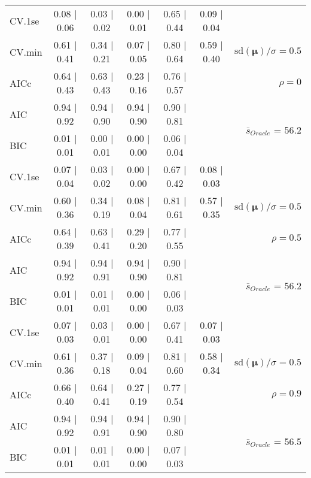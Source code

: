 \begin{table}
\begin{center}
\begin{tabular}{l*{5}{c}|r}
 \hline 
CV.1se & 0.08 $\mid$ 0.06 & 0.03 $\mid$ 0.02 & 0.00 $\mid$ 0.01 & 0.65 $\mid$ 0.44 & 0.09 $\mid$ 0.04 & \\
CV.min & 0.61 $\mid$ 0.41 & 0.34 $\mid$ 0.21 & 0.07 $\mid$ 0.05 & 0.80 $\mid$ 0.64 & 0.59 $\mid$ 0.40 &  $\mathrm{sd}(\mathbf{\mu})/\sigma=0.5$ \\
AICc & 0.64 $\mid$ 0.43 & 0.63 $\mid$ 0.43 & 0.23 $\mid$ 0.16 & 0.76 $\mid$ 0.57 & & $\rho=0$ \\
AIC & 0.94 $\mid$ 0.92 & 0.94 $\mid$ 0.90 & 0.94 $\mid$ 0.90 & 0.90 $\mid$ 0.81 & &  \multirow{2}{*}{$\bar{s}_{Oracle}$ = 56.2} \\
BIC & 0.01 $\mid$ 0.01 & 0.00 $\mid$ 0.01 & 0.00 $\mid$ 0.00 & 0.06 $\mid$ 0.04 & &  \\
 \hline 
CV.1se & 0.07 $\mid$ 0.04 & 0.03 $\mid$ 0.02 & 0.00 $\mid$ 0.00 & 0.67 $\mid$ 0.42 & 0.08 $\mid$ 0.03 & \\
CV.min & 0.60 $\mid$ 0.36 & 0.34 $\mid$ 0.19 & 0.08 $\mid$ 0.04 & 0.81 $\mid$ 0.61 & 0.57 $\mid$ 0.35 &  $\mathrm{sd}(\mathbf{\mu})/\sigma=0.5$ \\
AICc & 0.64 $\mid$ 0.39 & 0.63 $\mid$ 0.41 & 0.29 $\mid$ 0.20 & 0.77 $\mid$ 0.55 & & $\rho=0.5$ \\
AIC & 0.94 $\mid$ 0.92 & 0.94 $\mid$ 0.91 & 0.94 $\mid$ 0.90 & 0.90 $\mid$ 0.81 & &  \multirow{2}{*}{$\bar{s}_{Oracle}$ = 56.2} \\
BIC & 0.01 $\mid$ 0.01 & 0.01 $\mid$ 0.01 & 0.00 $\mid$ 0.00 & 0.06 $\mid$ 0.03 & &  \\
 \hline 
CV.1se & 0.07 $\mid$ 0.03 & 0.03 $\mid$ 0.01 & 0.00 $\mid$ 0.00 & 0.67 $\mid$ 0.41 & 0.07 $\mid$ 0.03 & \\
CV.min & 0.61 $\mid$ 0.36 & 0.37 $\mid$ 0.18 & 0.09 $\mid$ 0.04 & 0.81 $\mid$ 0.60 & 0.58 $\mid$ 0.34 &  $\mathrm{sd}(\mathbf{\mu})/\sigma=0.5$ \\
AICc & 0.66 $\mid$ 0.40 & 0.64 $\mid$ 0.41 & 0.27 $\mid$ 0.19 & 0.77 $\mid$ 0.54 & & $\rho=0.9$ \\
AIC & 0.94 $\mid$ 0.92 & 0.94 $\mid$ 0.91 & 0.94 $\mid$ 0.90 & 0.90 $\mid$ 0.80 & &  \multirow{2}{*}{$\bar{s}_{Oracle}$ = 56.5} \\
BIC & 0.01 $\mid$ 0.01 & 0.01 $\mid$ 0.01 & 0.00 $\mid$ 0.00 & 0.07 $\mid$ 0.03 & &  \\
 \hline 
\end{tabular}
\end{center}
\vspace{-1cm}
\end{table}




